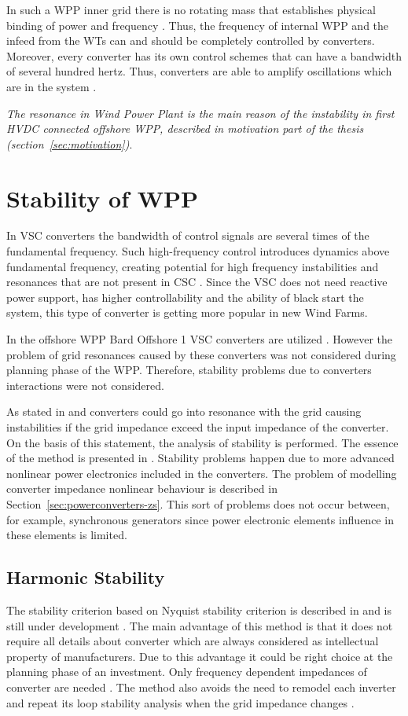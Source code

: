 \documentclass[12pt]{report} %
\begin{document}
In such a WPP inner grid there is no rotating mass that establishes physical binding of power and frequency \cite{borwin1}. Thus, the frequency of internal WPP and the infeed from the WTs can and should be completely controlled by converters. Moreover, every converter has its own control schemes that can have a bandwidth of several hundred hertz. Thus, converters are able to amplify oscillations which are in the system \cite{borwin1}.

\textit{The resonance in Wind Power Plant is the main reason of the instability in first HVDC connected offshore WPP, described in motivation part of the thesis (section~\ref{sec:motivation})}.

\section{Stability of WPP}
In VSC converters the bandwidth of control signals are several times of the fundamental frequency. Such high-frequency control introduces dynamics above fundamental frequency, creating potential for high frequency instabilities and resonances that are not present in CSC \cite{liusun2014}. Since the VSC does not need reactive power support, has higher controllability and the ability of black start the system, this type of converter is getting more popular in new Wind Farms.

In the offshore WPP Bard Offshore 1 VSC converters are utilized \cite{borwin1}. However the problem of grid resonances caused by these converters was not considered during planning phase of the WPP. Therefore, stability problems due to converters interactions were not considered.

As stated in \cite{sun2011} and \cite{liusun2014} converters could go into resonance with the grid causing instabilities if the grid impedance exceed the input impedance of the converter. On the basis of this statement, the analysis of stability is performed. The essence of the method is presented in \cite{middlebrook1976}. Stability problems happen due to more advanced nonlinear power electronics included in the converters. The problem of modelling converter impedance nonlinear behaviour is described in Section~\ref{sec:powerconverters-zs}. This sort of problems does not occur between, for example, synchronous generators since power electronic elements influence in these elements is limited.

\subsection{Harmonic Stability}
The stability criterion based on Nyquist stability criterion is described in \cite{sun2011} and is still under development \cite{borwin1}. The main advantage of this method is that it does not require all details about converter which are always considered as intellectual property of manufacturers. Due to this advantage it could be right choice at the planning phase of an investment. Only frequency dependent impedances of converter are needed \cite{borwin1}. The method also avoids the need to remodel each inverter and repeat its loop stability analysis when the grid impedance changes \cite{sun2011}.
\end{document}
